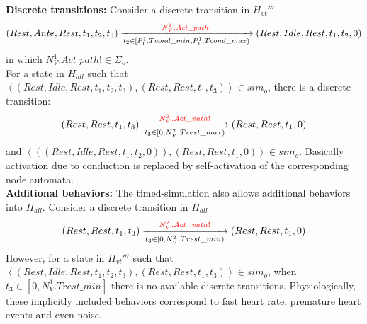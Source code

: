 %
\textbf{Discrete transitions: }Consider a discrete transition in $H_{vt}'''$
$$(Rest,Ante,Rest,t_1,t_2,t_3)\xrightarrow[t_2\in [P^1_1.Tcond\_min, P^1_1.Tcond\_max) ]{\textcolor{red}{N^1_V.Act\_path!}}(Rest,Idle,Rest,t_1,t_2,0)$$
in which $N^1_V.Act\_path!\in\Sigma_o$. \\
For a state in $H_{all}$ such that $\left\langle (Rest,Idle,Rest,t_1,t_2,t_3) ,(Rest,Rest,t_1,t_3)\right\rangle\in sim_o$,  there is a discrete transition:
$$(Rest,Rest,t_1,t_3)\xrightarrow[t_3\in [0, N^2_V.Trest\_max)]{\textcolor{red}{N^2_V.Act\_path!}}(Rest,Rest,t_1,0)$$
and $\left\langle ((Rest,Idle,Rest,t_1,t_2,0)),(Rest,Rest,t_1,0)\right\rangle\in sim_o$. Basically activation due to conduction is replaced by self-activation of the corresponding node automata.\\
\textbf{Additional behaviors: }The timed-simulation also allows additional behaviors into $H_{all}$. Consider a discrete transition in $H_{all}$
$$(Rest,Rest,t_1,t_3)\xrightarrow[t_3\in [0, N^2_V.Trest\_min)]{\textcolor{red}{N^2_V.Act\_path!}}(Rest,Rest,t_1,0)$$
However, for a state in $H_{vt}'''$ such that $\left\langle (Rest,Idle,Rest,t_1,t_2,t_3),(Rest,Rest,t_1,t_3)\right\rangle\in sim_o$, when $t_3\in [0, N^1_V.Trest\_min]$ there is no available discrete transitions. Physiologically, these implicitly included behaviors correspond to fast heart rate, premature heart events and even noise.



